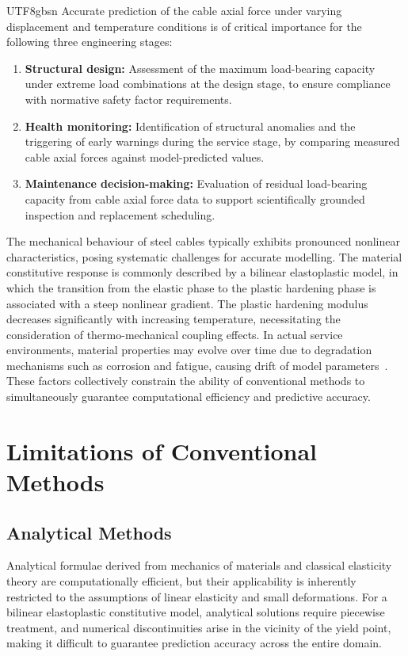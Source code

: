 \documentclass[a4paper,12pt]{report}
\begin{document}
\begin{CJK}{UTF8}{gbsn}
Accurate prediction of the cable axial force under varying displacement and temperature
conditions is of critical importance for the following three engineering stages:

\begin{enumerate}
  \item \textbf{Structural design:} Assessment of the maximum load-bearing capacity under
    extreme load combinations at the design stage, to ensure compliance with normative
    safety factor requirements.
  \item \textbf{Health monitoring:} Identification of structural anomalies and the
    triggering of early warnings during the service stage, by comparing measured cable
    axial forces against model-predicted values.
  \item \textbf{Maintenance decision-making:} Evaluation of residual load-bearing capacity
    from cable axial force data to support scientifically grounded inspection and
    replacement scheduling.
\end{enumerate}

The mechanical behaviour of steel cables typically exhibits pronounced nonlinear
characteristics, posing systematic challenges for accurate modelling. The material
constitutive response is commonly described by a bilinear elastoplastic model, in which
the transition from the elastic phase to the plastic hardening phase is associated with
a steep nonlinear gradient. The plastic hardening modulus decreases significantly with
increasing temperature, necessitating the consideration of thermo-mechanical coupling
effects. In actual service environments, material properties may evolve over time due
to degradation mechanisms such as corrosion and fatigue, causing drift of model
parameters~\cite{svendsen2022corrosion}. These factors collectively constrain the ability of conventional methods to
simultaneously guarantee computational efficiency and predictive accuracy.

\section{Limitations of Conventional Methods}
\label{sec:intro_limitations}

\subsection{Analytical Methods}
\label{subsec:intro_analytical}

Analytical formulae derived from mechanics of materials and classical elasticity theory
are computationally efficient, but their applicability is inherently restricted to the
assumptions of linear elasticity and small deformations. For a bilinear elastoplastic
constitutive model, analytical solutions require piecewise treatment, and numerical
discontinuities arise in the vicinity of the yield point, making it difficult to guarantee
prediction accuracy across the entire domain.


\end{CJK}
\end{document}

